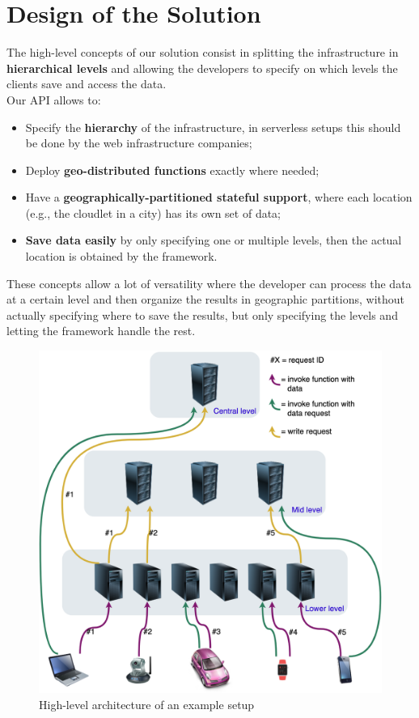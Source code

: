 \section{Design of the Solution}
\label{sec:design-of-the-solution}


The high-level concepts of our solution consist in splitting the infrastructure in \textbf{hierarchical levels} and allowing the developers to specify on which levels the clients save and access the data.
\\Our API allows to:
\begin{itemize}
    \item Specify the \textbf{hierarchy} of the infrastructure, in serverless setups this should be done by the web infrastructure companies;
    \item Deploy \textbf{geo-distributed functions} exactly where needed;
    \item Have a \textbf{geographically-partitioned stateful support}, where each location (e.g., the cloudlet in a city) has its own set of data;
    \item \textbf{Save data easily} by only specifying one or multiple levels, then the actual location is obtained by the framework.
\end{itemize}

These concepts allow a lot of versatility where the developer can process the data at a certain level and then organize the results in geographic partitions, without actually specifying where to save the results, but only specifying the levels and letting the framework handle the rest.

\begin{figure}
    \centering
    \includegraphics[width=0.99\linewidth]{Figures/Solution/high-level-architecture.png}
    \caption{High-level architecture of an example setup}
    \label{fig:high-level-architecture}
\end{figure}


